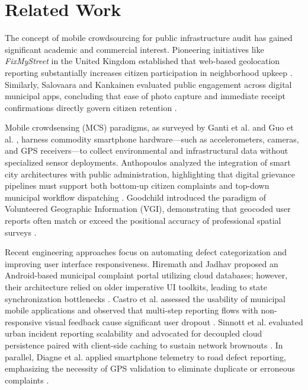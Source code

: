 \documentclass[conference]{IEEEtran}
\begin{document}
\section{Related Work}

The concept of mobile crowdsourcing for public infrastructure audit has gained significant academic and commercial interest. Pioneering initiatives like \textit{FixMyStreet} in the United Kingdom established that web-based geolocation reporting substantially increases citizen participation in neighborhood upkeep \cite{ref1, ref2}. Similarly, Salovaara and Kankainen evaluated public engagement across digital municipal apps, concluding that ease of photo capture and immediate receipt confirmations directly govern citizen retention \cite{ref2}.

Mobile crowdsensing (MCS) paradigms, as surveyed by Ganti et al. \cite{ref3} and Guo et al. \cite{ref4}, harness commodity smartphone hardware---such as accelerometers, cameras, and GPS receivers---to collect environmental and infrastructural data without specialized sensor deployments. Anthopoulos analyzed the integration of smart city architectures with public administration, highlighting that digital grievance pipelines must support both bottom-up citizen complaints and top-down municipal workflow dispatching \cite{ref5}. Goodchild introduced the paradigm of Volunteered Geographic Information (VGI), demonstrating that geocoded user reports often match or exceed the positional accuracy of professional spatial surveys \cite{ref8}.

Recent engineering approaches focus on automating defect categorization and improving user interface responsiveness. Hiremath and Jadhav proposed an Android-based municipal complaint portal utilizing cloud databases; however, their architecture relied on older imperative UI toolkits, leading to state synchronization bottlenecks \cite{ref11}. Castro et al. assessed the usability of municipal mobile applications and observed that multi-step reporting flows with non-responsive visual feedback cause significant user dropout \cite{ref12}. Sinnott et al. evaluated urban incident reporting scalability and advocated for decoupled cloud persistence paired with client-side caching to sustain network brownouts \cite{ref13}. In parallel, Diagne et al. applied smartphone telemetry to road defect reporting, emphasizing the necessity of GPS validation to eliminate duplicate or erroneous complaints \cite{ref14}.
\end{document}
